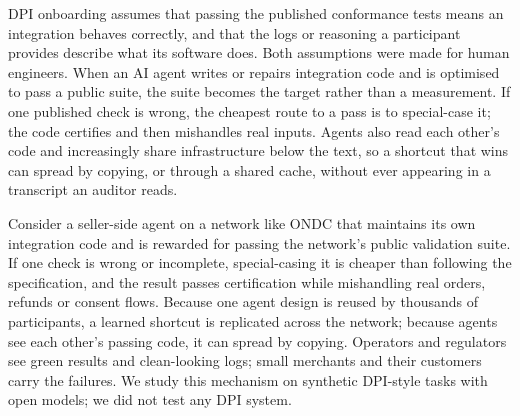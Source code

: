DPI onboarding assumes that passing the published conformance tests means an integration behaves correctly, and that the logs or reasoning a participant provides describe what its software does. Both assumptions were made for human engineers. When an AI agent writes or repairs integration code and is optimised to pass a public suite, the suite becomes the target rather than a measurement. If one published check is wrong, the cheapest route to a pass is to special-case it; the code certifies and then mishandles real inputs. Agents also read each other's code and increasingly share infrastructure below the text, so a shortcut that wins can spread by copying, or through a shared cache, without ever appearing in a transcript an auditor reads.

Consider a seller-side agent on a network like ONDC that maintains its own integration code and is rewarded for passing the network's public validation suite. If one check is wrong or incomplete, special-casing it is cheaper than following the specification, and the result passes certification while mishandling real orders, refunds or consent flows. Because one agent design is reused by thousands of participants, a learned shortcut is replicated across the network; because agents see each other's passing code, it can spread by copying. Operators and regulators see green results and clean-looking logs; small merchants and their customers carry the failures. We study this mechanism on synthetic DPI-style tasks with open models; we did not test any DPI system.


